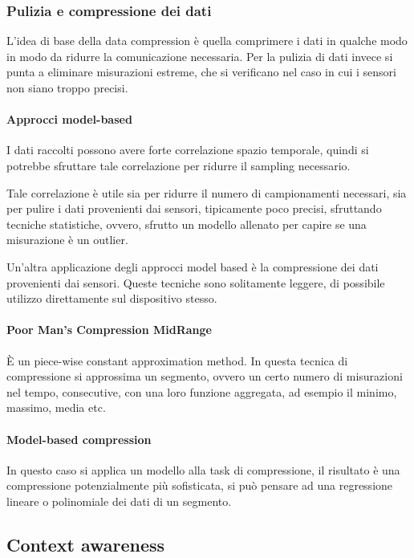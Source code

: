 \subsubsection{Pulizia e compressione dei dati}

L'idea di base della data compression è quella 
comprimere i dati in qualche modo in modo da 
ridurre la comunicazione necessaria. Per la pulizia 
di dati invece si punta a eliminare misurazioni 
estreme, che si verificano nel caso in cui i 
sensori non siano troppo precisi.

\paragraph{Approcci model-based}
I dati raccolti possono avere forte correlazione spazio temporale, quindi
si potrebbe sfruttare tale correlazione per ridurre il sampling necessario.

Tale correlazione è utile sia per ridurre il numero di campionamenti 
necessari, sia per pulire i dati provenienti dai sensori, tipicamente 
poco precisi, sfruttando tecniche statistiche, ovvero, sfrutto un modello allenato per capire 
se una misurazione è un outlier.

Un'altra applicazione degli approcci model based è la compressione dei dati 
provenienti dai sensori.
Queste tecniche sono solitamente leggere, di possibile utilizzo direttamente 
sul dispositivo stesso.

\paragraph{Poor Man's Compression MidRange}
È un piece-wise constant approximation method.
In questa tecnica di compressione si approssima un segmento, 
ovvero un certo numero di misurazioni nel tempo, consecutive, 
con una loro funzione aggregata, ad esempio il minimo, massimo, media etc.

\paragraph{Model-based compression}
In questo caso si applica un modello alla task di compressione, il risultato è 
una compressione potenzialmente più sofisticata, 
si può pensare ad una regressione lineare o polinomiale dei dati di un 
segmento.

\subsection{Context awareness}

